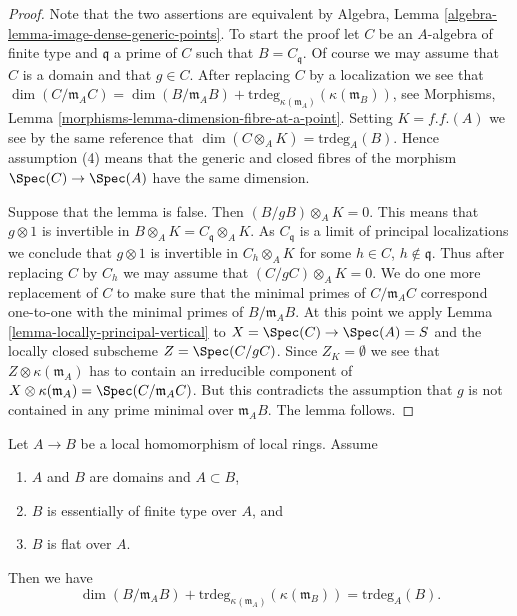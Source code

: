 \begin{proof}
Note that the two assertions are equivalent by
Algebra, Lemma \ref{algebra-lemma-image-dense-generic-points}.
To start the proof let $C$ be an $A$-algebra of finite type
and $\mathfrak q$ a prime of $C$ such that $B = C_{\mathfrak q}$.
Of course we may assume that $C$ is a domain and that $g \in C$.
After replacing $C$ by a localization we see that
$\dim(C/\mathfrak m_AC) = \dim(B/\mathfrak m_AB) +
\text{trdeg}_{\kappa(\mathfrak m_A)}(\kappa(\mathfrak m_B))$, see
Morphisms, Lemma \ref{morphisms-lemma-dimension-fibre-at-a-point}.
Setting $K = f.f.(A)$ we see by the same reference that
$\dim(C \otimes_A K) = \text{trdeg}_A(B)$. Hence assumption
(4) means that the generic and closed fibres of the morphism
$\Spec(C) \to \Spec(A)$ have the same dimension.

\medskip\noindent
Suppose that the lemma is false. Then $(B/gB) \otimes_A K = 0$.
This means that $g \otimes 1$ is invertible in $B \otimes_A K
= C_{\mathfrak q} \otimes_A K$. As $C_{\mathfrak q}$ is a limit
of principal localizations we conclude that $g \otimes 1$
is invertible in $C_h \otimes_A K$ for some
$h \in C$, $h \not \in \mathfrak q$. Thus after replacing $C$
by $C_h$ we may assume that $(C/gC) \otimes_A K = 0$.
We do one more replacement of $C$ to make sure that the minimal
primes of $C/\mathfrak m_AC$ correspond one-to-one with the minimal
primes of $B/\mathfrak m_AB$. At this point we apply
Lemma \ref{lemma-locally-principal-vertical}
to $X = \Spec(C) \to \Spec(A) = S$ and the locally closed
subscheme $Z = \Spec(C/gC)$. Since $Z_K = \emptyset$ we see that
$Z \otimes \kappa(\mathfrak m_A)$ has to contain an irreducible
component of
$X \otimes \kappa(\mathfrak m_A) = \Spec(C/\mathfrak m_AC)$.
But this contradicts the assumption that $g$ is not contained
in any prime minimal over $\mathfrak m_AB$. The lemma follows.
\end{proof}

\begin{lemma}
\label{lemma-equality-dimensions}
Let $A \to B$ be a local homomorphism of local rings. Assume
\begin{enumerate}
\item $A$ and $B$ are domains and $A \subset B$,
\item $B$ is essentially of finite type over $A$, and
\item $B$ is flat over $A$.
\end{enumerate}
Then we have
$$
\dim(B/\mathfrak m_AB) +
\text{trdeg}_{\kappa(\mathfrak m_A)}(\kappa(\mathfrak m_B)) =
\text{trdeg}_A(B).
$$
\end{lemma}

